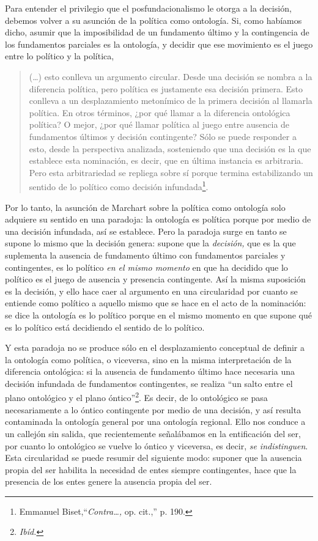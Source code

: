 Para entender el privilegio que el posfundacionalismo le otorga a la decisión, debemos volver a su asunción de la política como ontología. Si, como habíamos dicho, asumir que la imposibilidad de un fundamento último y la contingencia de los fundamentos parciales es la ontología, y decidir que ese movimiento es el juego entre lo político y la política,

\begin{quote}
(\dots) esto conlleva un argumento circular. Desde una decisión se nombra a la diferencia política, pero política es justamente esa decisión primera. Esto conlleva a un desplazamiento metonímico de la primera decisión al llamarla política. En otros términos, ¿por qué llamar a la diferencia ontológica política? O mejor, ¿por qué llamar política al juego entre ausencia de fundamentos últimos y decisión contingente? Sólo se puede responder a esto, desde la perspectiva analizada, sosteniendo que una decisión es la que establece esta nominación, es decir, que en última instancia es arbitraria. Pero esta arbitrariedad se repliega sobre sí porque termina estabilizando un sentido de lo político como decisión infundada\footnote{Emmanuel Biset,\enquote{\emph{Contra\ldots,} op. cit.,} p. 190.}.
\end{quote}

Por lo tanto, la asunción de Marchart sobre la política como ontología solo adquiere su sentido en una paradoja: la ontología es política porque por medio de una decisión infundada, así se establece. Pero la paradoja surge en tanto se supone lo mismo que la decisión genera: supone que la \emph{decisión,} que es la que suplementa la ausencia de fundamento último con fundamentos parciales y contingentes, es lo político \emph{en el mismo momento} en que ha decidido que lo político es el juego de ausencia y presencia contingente. Así la misma suposición es la decisión, y ello hace caer al argumento en una circularidad por cuanto se entiende como político a aquello mismo que se hace en el acto de la nominación: se dice la ontología es lo político porque en el mismo momento en que supone qué es lo político está decidiendo el sentido de lo político.

Y esta paradoja no se produce sólo en el desplazamiento conceptual de definir a la ontología como política, o viceversa, sino en la misma interpretación de la diferencia ontológica: si la ausencia de fundamento último hace necesaria una decisión infundada de fundamentos contingentes, se realiza \enquote{un salto entre el plano ontológico y el plano óntico}\footnote{\emph{Ibíd.}}. Es decir, de lo ontológico se pasa necesariamente a lo óntico contingente por medio de una decisión, y así resulta contaminada la ontología general por una ontología regional. Ello nos conduce a un callejón sin salida, que recientemente señalábamos en la entificación del ser, por cuanto lo ontológico se vuelve lo óntico y viceversa, es decir, \emph{se indistinguen}. Esta circularidad se puede resumir del siguiente modo: suponer que la ausencia propia del ser habilita la necesidad de entes siempre contingentes, hace que la presencia de los entes genere la ausencia propia del ser.

